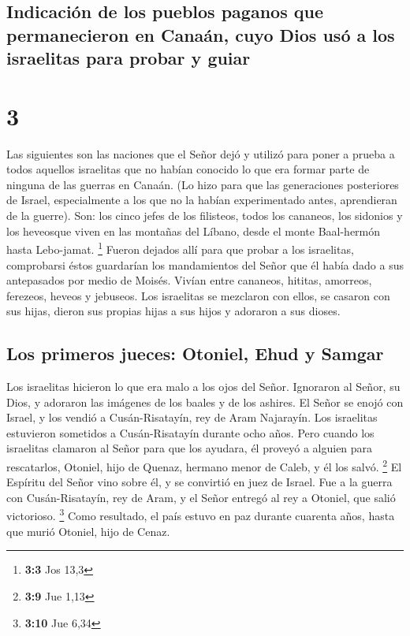 \hypertarget{indicaciuxf3n-de-los-pueblos-paganos-que-permanecieron-en-canauxe1n-cuyo-dios-usuxf3-a-los-israelitas-para-probar-y-guiar}{%
\subsection{Indicación de los pueblos paganos que permanecieron en
Canaán, cuyo Dios usó a los israelitas para probar y
guiar}\label{indicaciuxf3n-de-los-pueblos-paganos-que-permanecieron-en-canauxe1n-cuyo-dios-usuxf3-a-los-israelitas-para-probar-y-guiar}}

\hypertarget{section-2}{%
\section{3}\label{section-2}}

 Las siguientes son las naciones que el Señor dejó y
utilizó para poner a prueba a todos aquellos israelitas que no habían
conocido lo que era formar parte de ninguna de las guerras en Canaán.
 (Lo hizo para que las generaciones posteriores de Israel,
especialmente a los que no la habían experimentado antes, aprendieran de
la guerre).  Son: los cinco jefes de los filisteos, todos
los cananeos, los sidonios y los heveosque viven en las montañas del
Líbano, desde el monte Baal-hermón hasta Lebo-jamat. \footnote{\textbf{3:3}
  Jos 13,3}  Fueron dejados allí para que probar a los
israelitas, comprobarsi éstos guardarían los mandamientos del Señor que
él había dado a sus antepasados por medio de Moisés. 
Vivían entre cananeos, hititas, amorreos, ferezeos, heveos y jebuseos.
 Los israelitas se mezclaron con ellos, se casaron con sus
hijas, dieron sus propias hijas a sus hijos y adoraron a sus dioses.

\hypertarget{los-primeros-jueces-otoniel-ehud-y-samgar}{%
\subsection{Los primeros jueces: Otoniel, Ehud y
Samgar}\label{los-primeros-jueces-otoniel-ehud-y-samgar}}

 Los israelitas hicieron lo que era malo a los ojos del
Señor. Ignoraron al Señor, su Dios, y adoraron las imágenes de los
baales y de los ashires.  El Señor se enojó con Israel, y
los vendió a Cusán-Risatayín, rey de Aram Najarayín. Los israelitas
estuvieron sometidos a Cusán-Risatayín durante ocho años. 
Pero cuando los israelitas clamaron al Señor para que los ayudara, él
proveyó a alguien para rescatarlos, Otoniel, hijo de Quenaz, hermano
menor de Caleb, y él los salvó. \footnote{\textbf{3:9} Jue 1,13}
 El Espíritu del Señor vino sobre él, y se convirtió en
juez de Israel. Fue a la guerra con Cusán-Risatayín, rey de Aram, y el
Señor entregó al rey a Otoniel, que salió victorioso. \footnote{\textbf{3:10}
  Jue 6,34}  Como resultado, el país estuvo en paz
durante cuarenta años, hasta que murió Otoniel, hijo de Cenaz.

